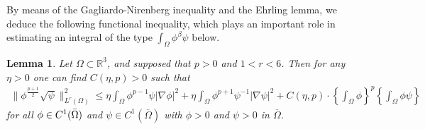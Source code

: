 \documentclass[12pt]{article}
\theoremstyle{plain}
\newtheorem{lemma}{Lemma}[section]
\theoremstyle{definition}
\numberwithin{equation}{section}
\begin{document}
By means of the Gagliardo-Nirenberg inequality and the Ehrling lemma, we deduce the following functional inequality, which plays an important
role in estimating  an integral of the type $\int_{\Omega}\phi^{\beta}\psi$ below.
\begin{lemma}\label{lemma2.8}
Let $\Omega \subset \mathbb R^3$, and supposed that $p>0$ and $1< r<6$. Then for any $\eta>0$ one can find $C(\eta, p)>0$ such
that
\begin{align}\label{2.38}
    \|\phi^{\frac{p+1}{2}}\sqrt{\psi}\|^2_{L^{r}(\Omega)}\leq \eta \int_{\Omega}\phi^{p-1}\psi|\nabla \phi|^2+\eta
    \int_{\Omega}\phi^{p+1}\psi^{-1}|\nabla \psi|^2+C(\eta, p)\cdot
    \left\{\int_{\Omega}\phi\right\}^{p}\left\{\int_{\Omega}\phi\psi\right\}
\end{align}for all $\phi\in C^1(\Bar{\Omega})$ and $\psi\in C^1(\overline{\Omega})$  with $\phi>0$ and $\psi>0$ in $\overline{\Omega}$.
\end{lemma}
\end{document}
